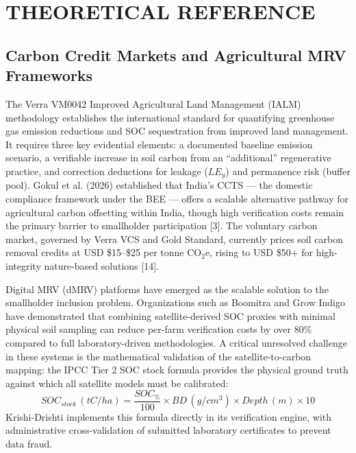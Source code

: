 \documentclass[10pt,a4paper]{article}
\begin{document}
\section{THEORETICAL REFERENCE}

\subsection{Carbon Credit Markets and Agricultural MRV Frameworks}
The Verra VM0042 Improved Agricultural Land Management (IALM) methodology establishes the international standard for quantifying greenhouse gas emission reductions and SOC sequestration from improved land management. It requires three key evidential elements: a documented baseline emission scenario, a verifiable increase in soil carbon from an ``additional'' regenerative practice, and correction deductions for leakage ($LE_y$) and permanence risk (buffer pool). Gokul et al. (2026) established that India's CCTS — the domestic compliance framework under the BEE — offers a scalable alternative pathway for agricultural carbon offsetting within India, though high verification costs remain the primary barrier to smallholder participation [3]. The voluntary carbon market, governed by Verra VCS and Gold Standard, currently prices soil carbon removal credits at USD \$15--\$25 per tonne CO$_2$e, rising to USD \$50+ for high-integrity nature-based solutions [14].

Digital MRV (dMRV) platforms have emerged as the scalable solution to the smallholder inclusion problem. Organizations such as Boomitra and Grow Indigo have demonstrated that combining satellite-derived SOC proxies with minimal physical soil sampling can reduce per-farm verification costs by over 80\% compared to full laboratory-driven methodologies. A critical unresolved challenge in these systems is the mathematical validation of the satellite-to-carbon mapping: the IPCC Tier 2 SOC stock formula provides the physical ground truth against which all satellite models must be calibrated:
\begin{equation}
    SOC_{stock}\,(tC/ha) = \frac{SOC_{\%}}{100} \times BD\,(g/cm^3) \times Depth\,(m) \times 10
\end{equation}
Krishi-Drishti implements this formula directly in its verification engine, with administrative cross-validation of submitted laboratory certificates to prevent data fraud.
\end{document}
